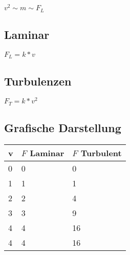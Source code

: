 \(v^2 \sim m \sim F_L\)

\subsection{Laminar}

\(F_L = k * v\)

\subsection{Turbulenzen}

\(F_T = k * v^2 \)

\subsection{Grafische Darstellung}

\begin{tabular}{|l|l|l|}
	\hline
	\textbf{v} & \textbf{\(F\) Laminar} & \textbf{\(F\) Turbulent} \\
	\hline
	0 & 0 & 0\\ \hline
	1 & 1 & 1\\ \hline
	2 & 2 & 4\\ \hline
	3 & 3 & 9\\ \hline
	4 & 4 & 16\\ \hline
	4 & 4 & 16\\ \hline
	
\end{tabular}
